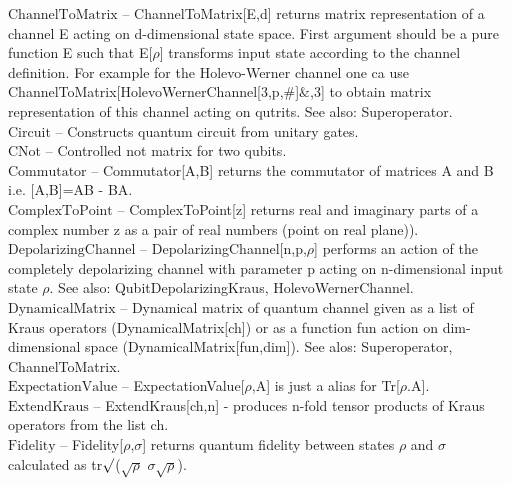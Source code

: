 \documentclass[a4paper,10pt]{scrartcl}
\begin{document}
\textbf{$ \text{ChannelToMatrix} $ }-- ChannelToMatrix[E,d] returns matrix representation of a channel E acting on d-dimensional state space. First argument should be a pure function E such that E[$\rho $] transforms input state according to the channel definition. For example for the Holevo-Werner channel one ca use ChannelToMatrix[HolevoWernerChannel[3,p,$\#$]$\&$,3] to obtain matrix representation of this channel acting on qutrits. See also: Superoperator.$  $\\

\textbf{$ \text{Circuit} $ }-- Constructs quantum circuit from unitary gates.$  $\\

\textbf{$ \text{CNot} $ }-- Controlled not matrix for two qubits.$  $\\

\textbf{$ \text{Commutator} $ }-- Commutator[A,B] returns the commutator of matrices A and B i.e. [A,B]=AB - BA.$  $\\

\textbf{$ \text{ComplexToPoint} $ }-- ComplexToPoint[z] returns real and imaginary parts of a complex number z as a pair of real numbers (point on real plane)).$  $\\

\textbf{$ \text{DepolarizingChannel} $ }-- DepolarizingChannel[n,p,$\rho $] performs an action of the completely depolarizing channel with parameter p acting on n-dimensional input state $\rho $. See also: QubitDepolarizingKraus, HolevoWernerChannel.$  $\\

\textbf{$ \text{DynamicalMatrix} $ }-- Dynamical matrix of quantum channel given as a list of Kraus operators (DynamicalMatrix[ch]) or as a function fun action on dim-dimensional space (DynamicalMatrix[fun,dim]). See alos: Superoperator, ChannelToMatrix.$  $\\

\textbf{$ \text{ExpectationValue} $ }-- ExpectationValue[$\rho $,A] is just a alias for Tr[$\rho $.A].$  $\\

\textbf{$ \text{ExtendKraus} $ }-- ExtendKraus[ch,n] - produces n-fold tensor products of Kraus operators from the list ch.$  $\\

\textbf{$ \text{Fidelity} $ }-- Fidelity[$\rho $,$\sigma $] returns quantum fidelity between states $\rho $ and $\sigma $ calculated as tr$\surd $($\surd \rho $ $\sigma \surd \rho $).$  $\\
\end{document}
